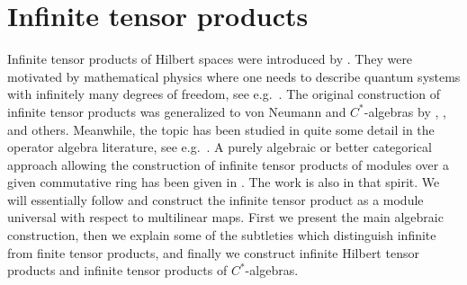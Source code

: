%
\section{Infinite tensor products}
\label{sec:infinite-tensor-products}

\para
Infinite tensor products of Hilbert spaces were introduced by  \cite{vNeuIDP}. They were motivated by mathematical physics
where one needs to describe quantum systems with infinitely many degrees of freedom, see e.g.~\cite{EmcAMSMQFT,BraRobOAQSM2}.
The original construction of infinite tensor products was generalized to von Neumann  and $C^*$-algebras
by \cite{GuiPTIRRA}, \cite{BlaITPC*A}, and others. Meanwhile, the topic has been studied in quite some
detail in the operator algebra literature, see e.g.~\cite{NakITPvNAI,NakITPvNAII,StoITPvNA}. 
A purely algebraic or better categorical approach allowing the construction of infinite tensor products of modules over
a given commutative ring has been given in \cite[Sec.~III.10]{CheFCA}. The work \cite{NgGIATP} is also in that spirit.
We will essentially follow \cite{CheFCA} and construct the infinite tensor product as a module
universal with respect to multilinear maps. First we present the main algebraic construction, then we explain some of
the subtleties which distinguish infinite from finite tensor products, and finally we construct infinite Hilbert
tensor products and infinite tensor products of $C^*$-algebras. 

